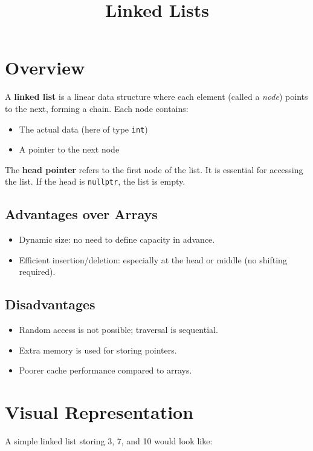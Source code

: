 \documentclass{article}
\title{Linked Lists}
\author{}
\date{}
\begin{document}
\maketitle


\section{Overview}

A \textbf{linked list} is a linear data structure where each element (called a \textit{node}) points to the next, forming a chain. Each node contains:
\begin{itemize}
  \item The actual data (here of type \texttt{int})
  \item A pointer to the next node
\end{itemize}

The \textbf{head pointer} refers to the first node of the list. It is essential for accessing the list. If the head is \texttt{nullptr}, the list is empty.

\subsection{Advantages over Arrays}
\begin{itemize}
  \item Dynamic size: no need to define capacity in advance.
  \item Efficient insertion/deletion: especially at the head or middle (no shifting required).
\end{itemize}

\subsection{Disadvantages}
\begin{itemize}
  \item Random access is not possible; traversal is sequential.
  \item Extra memory is used for storing pointers.
  \item Poorer cache performance compared to arrays.
\end{itemize}

\section{Visual Representation}
A simple linked list storing 3, 7, and 10 would look like:
\end{document}
